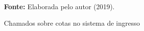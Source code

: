 \begin{figure}[ht!]
\centering

\caption{\textmd{Chamados sobre cotas no sistema de ingresso}}
\label{fig:chamados}
\par\medskip\textbf{Fonte:} Elaborada pelo autor (2019). \par\medskip

\end{figure}

